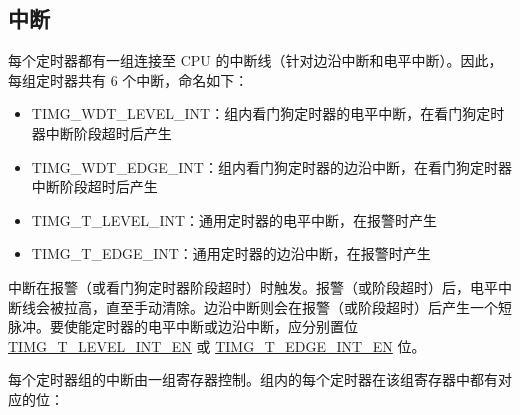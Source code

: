 \documentclass[main\_\_CN.tex]{subfiles}
\begin{document}
\subsection{中断}
每个定时器都有一组连接至 CPU 的中断线（针对边沿中断和电平中断）。因此，每组定时器共有 6 个中断，命名如下：
\begin{itemize}
\item \label{int:TIMERSWDTLEVELINT}TIMG\_WDT\_LEVEL\_INT：组内看门狗定时器的电平中断，在看门狗定时器中断阶段超时后产生
\item \label{int:TIMERSWDTEDGEINT}TIMG\_WDT\_EDGE\_INT：组内看门狗定时器的边沿中断，在看门狗定时器中断阶段超时后产生
\item \label{int:TIMERSTXLEVELINT}TIMG\_T\_LEVEL\_INT：通用定时器的电平中断，在报警时产生
\item \label{int:TIMERSTXEDGEINT}TIMG\_T\_EDGE\_INT：通用定时器的边沿中断，在报警时产生
\end{itemize}

中断在报警（或看门狗定时器阶段超时）时触发。报警（或阶段超时）后，电平中断线会被拉高，直至手动清除。边沿中断则会在报警（或阶段超时）后产生一个短脉冲。要使能定时器的电平中断或边沿中断，应分别置位 \hyperref[fielddesc:TIMGTXLEVELINTEN]{TIMG\_T\_LEVEL\_INT\_EN} 或 \hyperref[fielddesc:TIMGTXEDGEINTEN]{TIMG\_T\_EDGE\_INT\_EN} 位。

每个定时器组的中断由一组寄存器控制。组内的每个定时器在该组寄存器中都有对应的位：
\end{document}
